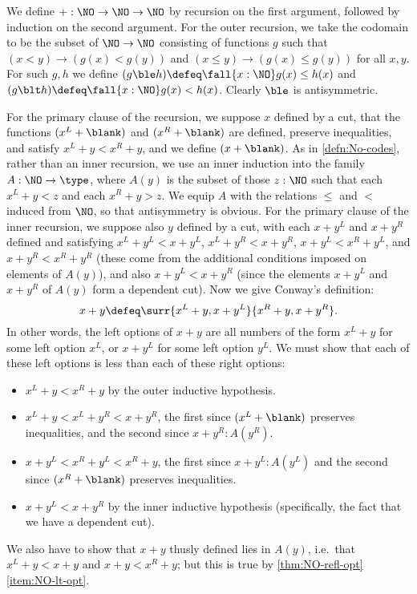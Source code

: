 \begin{eg}\label{eg:surreal-addition}
%
We define $\mathord+:\NO\to\NO\to\NO$ by recursion on the first argument, followed by induction on the second argument.
For the outer recursion, we take the codomain to be the subset of $\NO\to\NO$ consisting of functions $g$ such that $(x<y) \to (g(x)<g(y))$ and $(x\le y) \to (g(x)\le g(y))$ for all $x,y$.
For such $g,h$ we define $(g\ble h)\defeq \fall{x:\NO} g(x)\le h(x)$ and $(g\blt h)\defeq \fall{x:\NO} g(x)< h(x)$.
Clearly $\ble$ is antisymmetric.

For the primary clause of the recursion, we suppose $x$ defined by a cut, that the functions $(x^L+\blank)$ and $(x^R+\blank)$ are defined, preserve inequalities, and satisfy $x^L+y<x^R+y$, and we define $(x+\blank)$.
As in \cref{defn:No-codes}, rather than an inner recursion, we use an inner induction into the family $A:\NO\to\type$, where $A(y)$ is the subset of those $z:\NO$ such that each $x^L + y < z$ and each $x^R + y > z$.
We equip $A$ with the relations $\le$ and $<$ induced from $\NO$, so that antisymmetry is obvious.
For the primary clause of the inner recursion, we suppose also $y$ defined by a cut, with each $x+y^L$ and $x+y^R$ defined and satisfying $x^L+y^L < x+y^L$, $x^L+y^R < x+y^R$, $x+y^L < x^R + y^L$, and $x+y^R < x^R+y^R$ (these come from the additional conditions imposed on elements of $A(y)$), and also $x+y^L < x+y^R$ (since the elements $x+y^L$ and $x+y^R$ of $A(y)$ form a dependent cut).
Now we give Conway's definition:
\[ x+y \defeq \surr{x^L+y, x+y^L}{x^R+y,x+y^R}. \]
In other words, the left options of $x+y$ are all numbers of the form $x^L+y$ for some left option $x^L$, or $x+y^L$ for some left option $y^L$.
We must show that each of these left options is less than each of these right options:
\begin{itemize}
\item $x^L+y < x^R+y$ by the outer inductive hypothesis.
\item $x^L+y < x^L + y^R < x + y^R$, the first since $(x^L+\blank)$ preserves inequalities, and the second since $x+y^R : A(y^R)$.
\item $x+y^L < x^R+ y^L < x^R + y$, the first since $x+y^L : A(y^L)$ and the second since $(x^R+\blank)$ preserves inequalities.
\item $x+y^L < x+y^R$ by the inner inductive hypothesis (specifically, the fact that we have a dependent cut).
\end{itemize}
We also have to show that $x+y$ thusly defined lies in $A(y)$, i.e.\ that $x^L + y < x+y$ and $x+y < x^R + y$; but this is true by \cref{thm:NO-refl-opt}\ref{item:NO-lt-opt}.


\end{eg}
